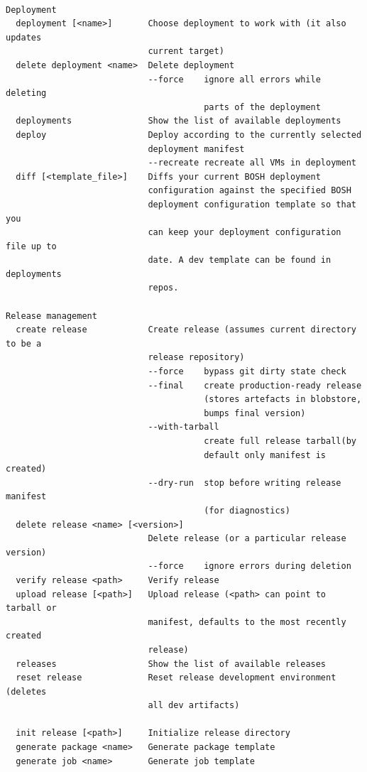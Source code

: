 \begin{adjustwidth}{2.5em}{2.5em}
\begin{verbatim}

Deployment
  deployment [<name>]       Choose deployment to work with (it also updates 
                            current target) 
  delete deployment <name>  Delete deployment 
                            --force    ignore all errors while deleting 
                                       parts of the deployment 
  deployments               Show the list of available deployments 
  deploy                    Deploy according to the currently selected 
                            deployment manifest 
                            --recreate recreate all VMs in deployment 
  diff [<template_file>]    Diffs your current BOSH deployment 
                            configuration against the specified BOSH 
                            deployment configuration template so that you 
                            can keep your deployment configuration file up to 
                            date. A dev template can be found in deployments 
                            repos. 

Release management
  create release            Create release (assumes current directory to be a 
                            release repository) 
                            --force    bypass git dirty state check 
                            --final    create production-ready release 
                                       (stores artefacts in blobstore, 
                                       bumps final version) 
                            --with-tarball 
                                       create full release tarball(by 
                                       default only manifest is created) 
                            --dry-run  stop before writing release manifest 
                                       (for diagnostics) 
  delete release <name> [<version>] 
                            Delete release (or a particular release version) 
                            --force    ignore errors during deletion 
  verify release <path>     Verify release 
  upload release [<path>]   Upload release (<path> can point to tarball or 
                            manifest, defaults to the most recently created 
                            release) 
  releases                  Show the list of available releases 
  reset release             Reset release development environment (deletes 
                            all dev artifacts) 

  init release [<path>]     Initialize release directory 
  generate package <name>   Generate package template 
  generate job <name>       Generate job template 


\end{verbatim}
\end{adjustwidth}
